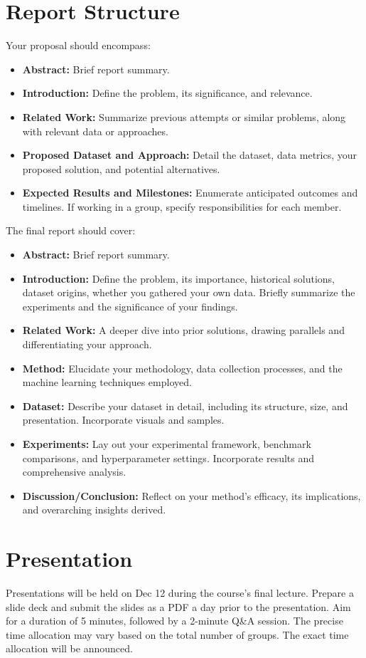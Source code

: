 \documentclass{article}
\begin{document}
\section{Report Structure}
Your proposal should encompass:
\begin{itemize}
  \item \textbf{Abstract:} Brief report summary.
  \item \textbf{Introduction:} Define the problem, its significance, and relevance.
  \item \textbf{Related Work:} Summarize previous attempts or similar problems, along with relevant data or approaches.
  \item \textbf{Proposed Dataset and Approach:} Detail the dataset, data metrics, your proposed solution, and potential alternatives.
  \item \textbf{Expected Results and Milestones:} Enumerate anticipated outcomes and timelines. If working in a group, specify responsibilities for each member.
\end{itemize}

The final report should cover:
\begin{itemize}
  \item \textbf{Abstract:} Brief report summary.
  \item \textbf{Introduction:} Define the problem, its importance, historical solutions, dataset origins, whether you gathered your own data. Briefly summarize the experiments and the significance of your findings.
  \item \textbf{Related Work:} A deeper dive into prior solutions, drawing parallels and differentiating your approach.
  \item \textbf{Method:} Elucidate your methodology, data collection processes, and the machine learning techniques employed.
  \item \textbf{Dataset:} Describe your dataset in detail, including its structure, size, and presentation. Incorporate visuals and samples.
  \item \textbf{Experiments:} Lay out your experimental framework, benchmark comparisons, and hyperparameter settings. Incorporate results and comprehensive analysis.
  \item \textbf{Discussion/Conclusion:} Reflect on your method's efficacy, its implications, and overarching insights derived.
\end{itemize}

\section{Presentation}
Presentations will be held on Dec 12 during the course's final lecture. Prepare a slide deck and submit the slides as a PDF a day prior to the presentation.  Aim for a duration of 5 minutes, followed by a 2-minute Q\&A session. The precise time allocation may vary based on the total number of groups. The exact time allocation will be announced.
\end{document}
